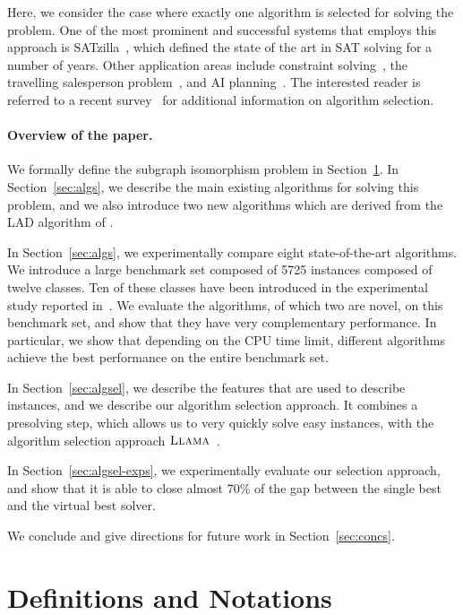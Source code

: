 \documentclass{llncs}
\newcommand{\LLAMA}{$\textsc{Llama}$\xspace}
\begin{document}
Here, we consider the case where exactly one algorithm is selected for solving the problem. One of
the most prominent and successful systems that employs this approach is
SATzilla~\cite{xu_satzilla_2008}, which defined the state of the art in SAT solving for a number of
years. Other application areas include constraint solving~\cite{omahony_using_2008}, the travelling
salesperson problem~\cite{kotthoff_improving_2015}, and AI planning~\cite{seipp_learning_2012}.
The interested reader is referred to a recent survey~\cite{kotthoff_algorithm_2014} for additional
information on algorithm selection.

\paragraph{Overview of the paper.}
We formally define the subgraph isomorphism problem in Section~\ref{sec:defs}. 
In Section~\ref{sec:algs}, we describe the main existing algorithms for solving this problem, and we also introduce two new algorithms which are derived from the LAD algorithm of \cite{Solnon:2010}. 

In Section~\ref{sec:algs}, we experimentally compare eight state-of-the-art
algorithms. We introduce a large benchmark set composed of 5725 instances
composed of twelve classes. Ten of these classes have been introduced in the
experimental study reported in~\cite{McCreesh:2015}. We evaluate the algorithms,
of which two are novel, on this benchmark set, and show that they have very
complementary performance. In particular, we show that depending on the CPU time
limit, different algorithms achieve the best performance on the entire benchmark
set.

In Section~\ref{sec:algsel}, we describe the features that are used to describe instances, and we describe our algorithm selection approach. It combines a presolving step, which allows us to very quickly solve easy instances, with the algorithm selection approach \LLAMA~\cite{kotthoff_llama_2013}. 

In Section~\ref{sec:algsel-exps}, we experimentally evaluate our selection
approach, and show that it is able to close almost 70\% of the gap between the
single best and the virtual best solver.

We conclude and give directions for future work in Section~\ref{sec:concs}.



\section{Definitions and Notations}\label{sec:defs}
\end{document}
